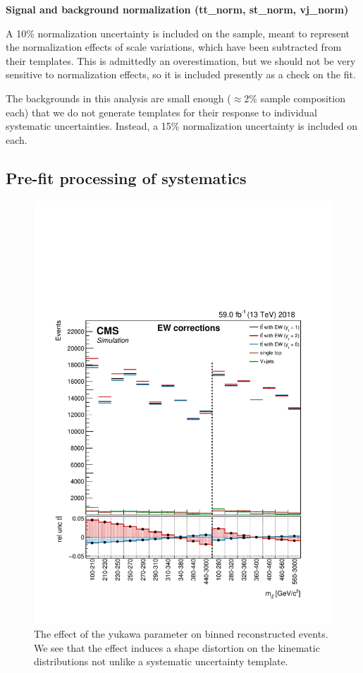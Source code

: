 \par \noindent
\textbf{Signal and background normalization (tt\_norm, st\_norm, vj\_norm)} 

A 10\% normalization uncertainty is included on the \ttbar sample, meant to represent the normalization effects of scale variations, which have been subtracted from their templates. This is admittedly an overestimation, but we should not be very sensitive to normalization effects, so it is included presently as a check on the fit.

The backgrounds in this analysis are small enough ($\approx$2\% sample composition each) that we do not generate templates for their response to individual systematic uncertainties. Instead, a 15\% normalization uncertainty is included on each.




\subsection{Pre-fit processing of systematics}
\label{SS:processing}

\begin{figure}
    \centering
    \includegraphics[width=0.8\linewidth]{templates/yuk.pdf}
    \caption{The effect of the yukawa parameter \yt on binned reconstructed events. We see that the effect induces a shape distortion on the kinematic distributions not unlike a systematic uncertainty template.}
    \label{fig:yuktemplate}
\end{figure}


